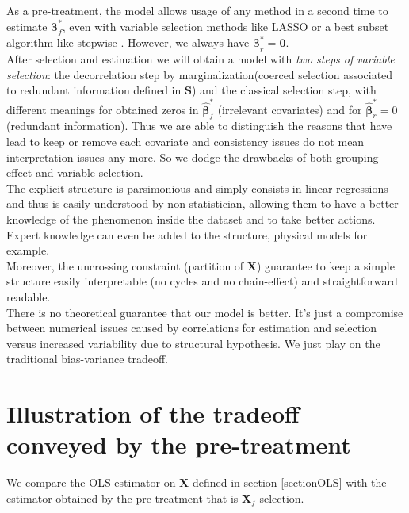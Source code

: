 \documentclass[12pt,a4paper]{report}
\begin{document}
As a pre-treatment, the model allows usage of any method in a second time to estimate $\boldsymbol{\beta}_{f}^*$, even with variable selection methods like LASSO or a best subset algorithm like stepwise \cite{seber2012linear}. However, we always have $\boldsymbol{\beta}^*_r=\boldsymbol{0}$.\\

After selection and estimation we will obtain a model with { \it two steps of variable selection}: the decorrelation step by marginalization(coerced selection associated to redundant information defined in $\boldsymbol{S}$) and the classical selection step, with different meanings for obtained zeros in $\hat{\boldsymbol{\beta}}^*_{f}$ (irrelevant covariates) and for $\hat{\boldsymbol{\beta}}^*_{r}=0$ (redundant information). 
 Thus we are able to distinguish the reasons that have lead to keep or remove each covariate and consistency issues do not mean interpretation issues any more. So we dodge the drawbacks of both grouping effect and variable selection.\\


The explicit structure is parsimonious and simply consists in linear regressions and thus is easily understood by non statistician, allowing them to have a better knowledge of the phenomenon inside the dataset and to take better actions. Expert knowledge can even be added to the structure, physical models for example.\\

Moreover, the uncrossing constraint (partition of $\boldsymbol{X}$) guarantee to keep a simple structure easily interpretable (no cycles and no chain-effect) and straightforward readable.\\
	
			There is no theoretical guarantee that our model is better. It's just a compromise between numerical issues caused by correlations for estimation and selection versus increased variability due to structural hypothesis. We just play on the traditional bias-variance tradeoff. 
			


	
	\section{Illustration of the tradeoff conveyed by the pre-treatment}	
	We compare the OLS estimator on $\boldsymbol{X}$ defined in section \ref{sectionOLS} with the estimator obtained by the pre-treatment that is $\boldsymbol{X}_f$ selection.
  
\end{document}
